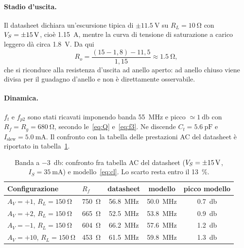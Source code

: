 \documentclass[11pt,a4paper]{article}
\begin{document}
\paragraph{Stadio d'uscita.} Il datasheet dichiara un'escursione tipica di
$\pm\SI{11.5}{\volt}$ su $R_L=\SI{10}{\ohm}$ con
$V_S=\SI{\pm15}{\volt}$, cioè \SI{1.15}{\ampere}, mentre la curva di
tensione di saturazione a carico leggero dà circa \SI{1.8}{\volt}. Da qui
\begin{equation}
  R_o = \frac{(15 - 1{,}8) - 11{,}5}{1{,}15} \approx \SI{1.5}{\ohm},
\end{equation}
che si riconduce alla resistenza d'uscita ad anello aperto: ad anello
chiuso viene divisa per il guadagno d'anello e non è direttamente
osservabile.

\paragraph{Dinamica.} $f_t$ e $f_{p2}$ sono stati ricavati imponendo
banda \SI{55}{\mega\hertz} e picco $\simeq\SI{1}{\decibel}$ con
$R_f=R_g=\SI{680}{\ohm}$, secondo le~\eqref{eq:Q} e~\eqref{eq:f3}. Ne
discende $C_t=\SI{5.6}{\pico\farad}$ e
$I_{\mathrm{slew}}=\SI{5.0}{\milli\ampere}$. Il confronto con la tabella
delle prestazioni AC del datasheet è riportato in
tabella~\ref{tab:valid}.

\begin{table}[h]
\centering
\small
\begin{tabular}{llccc}
\toprule
Configurazione & $R_f$ & datasheet & modello & picco modello \\
\midrule
$A_V=+1$, $R_L=\SI{150}{\ohm}$  & \SI{750}{\ohm} & \SI{56.8}{\mega\hertz} & \SI{50.0}{\mega\hertz} & \SI{0.7}{\decibel} \\
$A_V=+2$, $R_L=\SI{150}{\ohm}$  & \SI{665}{\ohm} & \SI{52.5}{\mega\hertz} & \SI{53.8}{\mega\hertz} & \SI{0.9}{\decibel} \\
$A_V=-1$, $R_L=\SI{150}{\ohm}$  & \SI{604}{\ohm} & \SI{66.2}{\mega\hertz} & \SI{57.6}{\mega\hertz} & \SI{1.2}{\decibel} \\
$A_V=+10$, $R_L=\SI{150}{\ohm}$ & \SI{453}{\ohm} & \SI{61.5}{\mega\hertz} & \SI{59.8}{\mega\hertz} & \SI{1.3}{\decibel} \\
\bottomrule
\end{tabular}
\caption{Banda a \SI{-3}{\decibel}: confronto fra tabella AC del datasheet
($V_S=\SI{\pm15}{\volt}$, $I_S=\SI{35}{\milli\ampere}$) e
modello~\eqref{eq:cl}. Lo scarto resta entro il \SI{13}{\percent}.}
\label{tab:valid}
\end{table}
\end{document}
